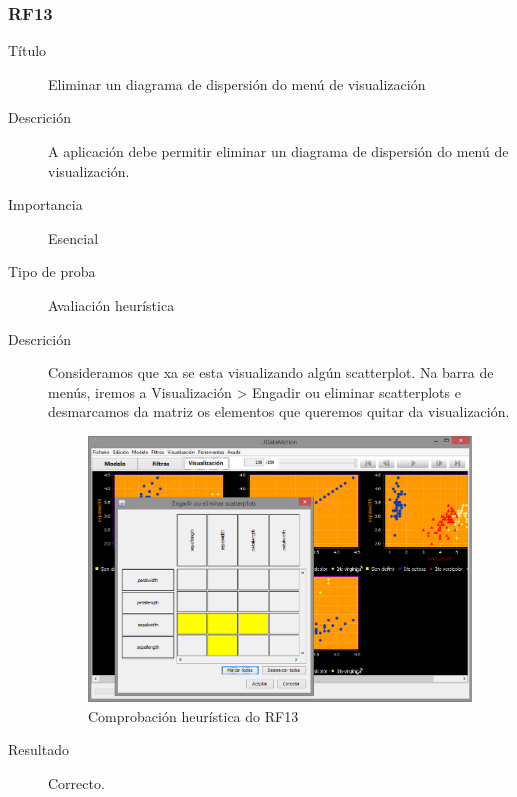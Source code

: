 \subsubsection*{RF13}
\begin{description}
\item[Título] \hfill
Eliminar un diagrama de dispersión do menú de visualización
\item[Descrición] \hfill
A aplicación debe permitir eliminar un diagrama de dispersión do menú de visualización.
\item[Importancia] \hfill
Esencial
\item[Tipo de proba] \hfill
Avaliación heurística
\item[Descrición]
Consideramos que xa se esta visualizando algún scatterplot. Na barra de menús, iremos a Visualización \textgreater{} Engadir ou eliminar scatterplots e desmarcamos da matriz os elementos que queremos quitar da visualización.
\begin{figure}
\centering
\includegraphics[width=\textwidth,height=\textheight,keepaspectratio]{figuras/RF1213}
\caption{Comprobación heurística do RF13}
\label{RF1213}
\end{figure}
\item[Resultado]
Correcto.
\end{description}

